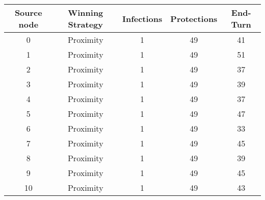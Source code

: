 \documentclass[results.tex]{subfiles}
\begin{document}
    \begin{center}
        \begin{tabular}{| c || c | c | c | c |}
            \hline
            {\bfseries Source node} & {\bfseries Winning Strategy} & {\bfseries Infections} & {\bfseries Protections}
            & {\bfseries End-Turn}
            \\  %
            \hline\hline
            0                       & Proximity                    & 1                      & 49                      & 41                   \\
            \hline
            1                       & Proximity                    & 1                      & 49                      & 51                   \\
            \hline
            2                       & Proximity                    & 1                      & 49                      & 37                   \\
            \hline
            3                       & Proximity                    & 1                      & 49                      & 39                   \\
            \hline
            4                       & Proximity                    & 1                      & 49                      & 37                   \\
            \hline
            5                       & Proximity                    & 1                      & 49                      & 47                   \\
            \hline
            6                       & Proximity                    & 1                      & 49                      & 33                   \\
            \hline
            7                       & Proximity                    & 1                      & 49                      & 45                   \\
            \hline
            8                       & Proximity                    & 1                      & 49                      & 39                   \\
            \hline
            9                       & Proximity                    & 1                      & 49                      & 45                   \\
            \hline
            10                      & Proximity                    & 1                      & 49                      & 43                   \\

\end{tabular}
\end{center}
\end{document}
